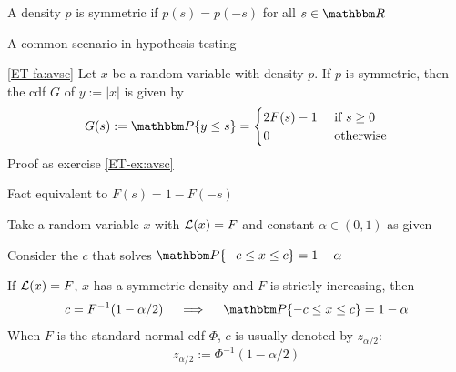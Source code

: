 \begin{frame}

    \vspace{2em}
    A density $p$ is symmetric if $p(s) = p(-s)$ for all $s \in \RR$
    
    A common scenario in hypothesis testing 
    
    \vspace{.7em}
    \Fact\eqref{ET-fa:avsc}
    Let $x$ be a random variable with density $p$.  If $p$ is symmetric, then
    the {\sc cdf} $G$ of $y := |x|$ is given by 
    \begin{equation*}
        G (s) 
        := \PP\{y\leq s\} 
        = 
        \begin{cases}
            2 F(s) - 1 & \text{ if } s \geq 0
            \\
            0 & \text{ otherwise}
        \end{cases}
    \end{equation*}
    Proof as exercise \ref{ET-ex:avsc}
    
    Fact equivalent to $F(s) = 1 - F(-s)$

\end{frame}

\begin{frame}

    \vspace{2em}
    Take a random variable $x$ with $\mathcal L(x) = F$ and constant $\alpha \in
    (0,1)$ as given
    
    \vspace{.7em}
    Consider the $c$ that solves $\PP\{-c \leq x \leq c \}  =
    1 - \alpha$
    
    \Fact
        If $\mathcal L(x) = F$, $x$ has a symmetric density and $F$ is strictly increasing, then
        \begin{equation}
            \label{eq:symcdf}
            c = F^{-1}(1 - \alpha/2) 
            \quad \implies \quad
            \PP\{-c \leq x \leq c\} = 1 - \alpha
        \end{equation}
    When $F$ is the standard normal {\sc cdf} $\Phi$, $c$ is usually denoted by $z_{\alpha/2}$:
    \begin{equation}
        \label{eq:zalpha2}
        z_{\alpha/2} := \Phi^{-1}(1 - \alpha/2)
    \end{equation}
    
\end{frame}

